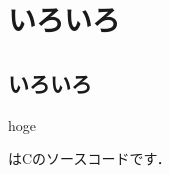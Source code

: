 \documentclass[10pt,a4paper]{jsarticle}
\begin{document}

\section{いろいろ}

\subsection{いろいろ}
hoge

はCのソースコードです．
\end{document}
